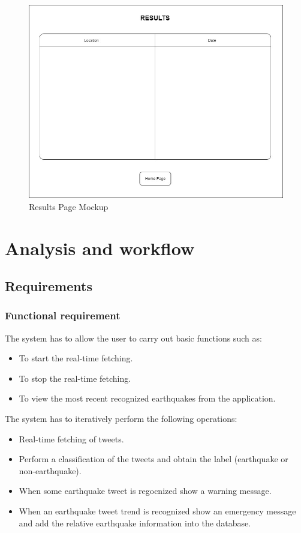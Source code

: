 \documentclass[a4paper, oneside]{article}
\begin{document}
\begin{figure}[h]
\centering
\includegraphics[width=\textwidth]{./images/diagrams/Charts} 
\caption{Results Page Mockup}
\label{fig:mockup}
\end{figure}

\clearpage

\section{Analysis and workflow}

\subsection{Requirements}

\subsubsection{Functional requirement}
The system has to allow the user to carry out basic functions such as:
\begin{itemize}
\item To start the real-time fetching.
\item To stop the real-time fetching.
\item To view the most recent recognized earthquakes from the application.
\end{itemize}
\vspace{2mm}
The system has to iteratively perform the following operations: 
\begin{itemize}
\item Real-time fetching of tweets.
\item Perform a classification of the tweets and obtain the label (earthquake or non-earthquake).
\item When some earthquake tweet is regocnized show a warning message.
\item When an earthquake tweet trend is recognized show an emergency message and add the relative earthquake information into the database.
\end{itemize}
\vspace{2mm}
\end{document}
